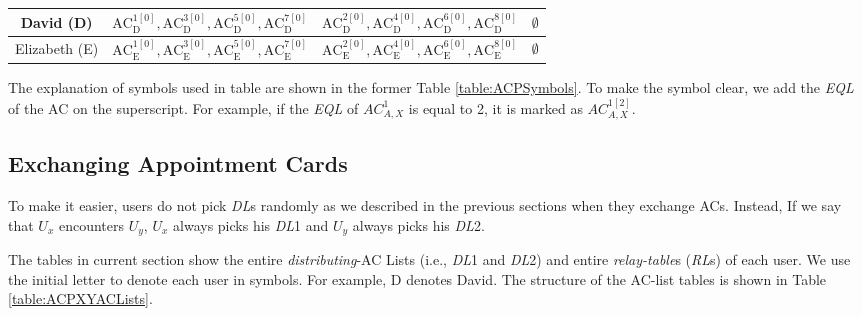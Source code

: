 \begin{table} [hbtp]
\begin{tabu}{|c|l|l|l|}
David (D) & ${\mathrm{AC}}^{\mathrm{1}\left[0\right]}_{\mathrm{D}},{\mathrm{AC}}^{\mathrm{3}\left[0\right]}_{\mathrm{D}},{\mathrm{AC}}^{\mathrm{5}\left[0\right]}_{\mathrm{D}},{\mathrm{AC}}^{\mathrm{7}\left[0\right]}_{\mathrm{D}}$ & ${\mathrm{AC}}^{\mathrm{2}\left[0\right]}_{\mathrm{D}},{\mathrm{AC}}^{\mathrm{4}\left[0\right]}_{\mathrm{D}},{\mathrm{AC}}^{\mathrm{6}\left[0\right]}_{\mathrm{D}},{\mathrm{AC}}^{\mathrm{8}\left[0\right]}_{\mathrm{D}}$ & $\mathrm{\emptyset }$ \\ \hline 
Elizabeth (E) & ${\mathrm{AC}}^{\mathrm{1}\left[0\right]}_{\mathrm{E}},{\mathrm{AC}}^{\mathrm{3}\left[0\right]}_{\mathrm{E}},{\mathrm{AC}}^{\mathrm{5}\left[0\right]}_{\mathrm{E}},{\mathrm{AC}}^{\mathrm{7}\left[0\right]}_{\mathrm{E}}$ & ${\mathrm{AC}}^{\mathrm{2}\left[0\right]}_{\mathrm{E}},{\mathrm{AC}}^{\mathrm{4}\left[0\right]}_{\mathrm{E}},{\mathrm{AC}}^{\mathrm{6}\left[0\right]}_{\mathrm{E}},{\mathrm{AC}}^{\mathrm{8}\left[0\right]}_{\mathrm{E}}$ & $\mathrm{\emptyset }$ \\ \hline 
\end{tabu}
\end{table}

The explanation of symbols used in table are shown in the former Table \ref{table:ACPSymbols}. To make the symbol clear, we add the \textit{EQL} of the AC on the superscript. For example, if the \textit{EQL} of ${AC}^1_{A,X}$ is equal to 2, it is marked as ${AC}^{1\left[2\right]}_{A,X}$.


\subsection{ Exchanging Appointment Cards}

\noindent To make it easier, users do not pick \textit{DL}s randomly as we described in the previous sections when they exchange ACs. Instead, If we say that $U_x$ encounters $U_y$, $U_x$ always picks his \textit{DL}1 and $U_y$ always picks his \textit{DL}2. 

The tables in current section show the entire \textit{distributing}-AC Lists (i.e., \textit{DL}1 and \textit{DL}2) and entire \textit{relay-table}s (\textit{RL}s) of each user. We use the initial letter to denote each user in symbols. For example, D denotes David. The structure of the AC-list tables is shown in Table \ref{table:ACPXYACLists}.

